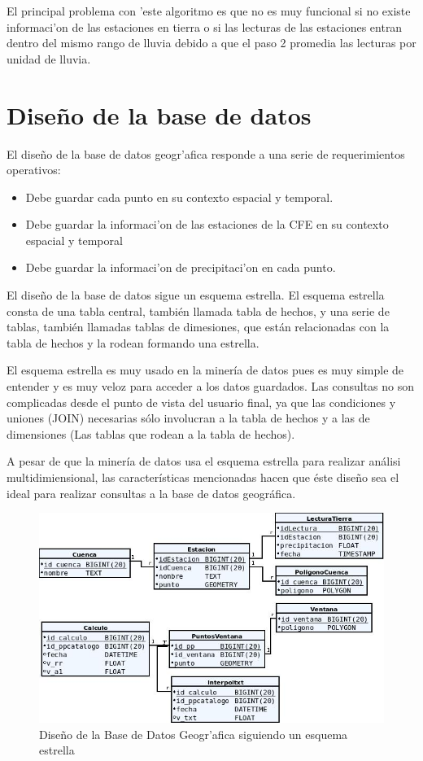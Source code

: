 El principal problema con 'este algoritmo es que no es muy funcional
si no existe informaci'on de las estaciones en tierra o si las
lecturas de las estaciones entran dentro del mismo rango de lluvia
debido a que el paso 2 promedia las lecturas por unidad de lluvia.

\section{Dise\~no de la base de datos}

El dise\~no de la base de datos geogr'afica responde a una serie de requerimientos operativos:
\begin{itemize}
 \item Debe guardar cada punto en su contexto espacial y temporal.
 \item Debe guardar la informaci'on de las estaciones de la CFE en su contexto espacial y temporal
 \item Debe guardar la informaci'on de precipitaci'on en cada punto.
\end{itemize}
El dise\~no de la base de datos sigue un esquema estrella\cite{starsqueme}. El esquema estrella consta de una tabla central, tambi\'en 
llamada tabla de hechos, y una serie de tablas, tambi\'en llamadas tablas de dimesiones, que est\'an relacionadas con la tabla de hechos y la rodean 
formando una estrella. 

El esquema estrella es muy usado en la miner\'ia de datos pues es muy simple de entender y es muy veloz para acceder a los datos guardados. 
Las consultas no son complicadas desde el punto de vista del usuario final, ya que las condiciones y uniones (JOIN) necesarias s\'olo 
involucran a la tabla de hechos y a las de dimensiones (Las tablas que rodean a la tabla de hechos).

A pesar de que la miner\'ia de datos usa el esquema estrella para realizar an\'alisi multidimiensional, las caracter\'isticas mencionadas 
hacen que \'este dise\~no sea el ideal para realizar consultas a la base de datos geogr\'afica. 


\begin{figure}[h!]
 \centering
 \includegraphics[width=150mm]{./imagenes/DataBase.jpg}
 \caption{Dise\~no de la Base de Datos Geogr'afica siguiendo un esquema estrella}
\end{figure}

